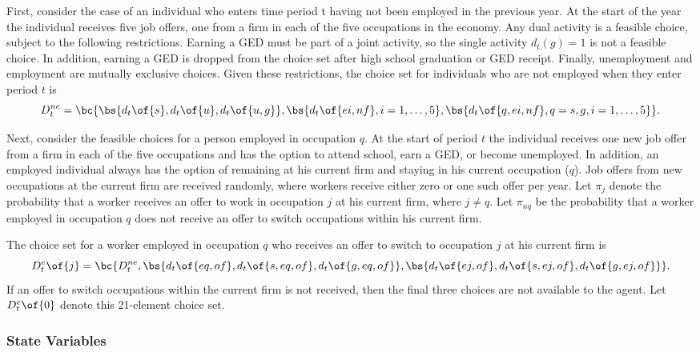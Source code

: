 \documentclass[12pt]{article}
\theoremstyle{definition}
\begin{document}
First, consider the case of an individual who enters time period t having not been employed in the previous year. At the start of the year the individual receives five job offers, one from a firm in each of the five occupations in the economy. Any dual activity is a feasible choice, subject to the following restrictions. Earning a GED must be part of a joint activity, so the single activity $d_t(g) = 1$ is not a feasible choice. In addition, earning a GED is dropped from the choice set after high school graduation or GED receipt. Finally, unemployment and employment are mutually exclusive choices. Given these restrictions, the choice set for individuals who are not employed when they enter period $t$ is
\begin{equation}
    \label{5}
    D_t^{ne} = \bc{\bs{d_t\of{s}, d_t\of{u}, d_t\of{u, g}}, \bs{d_t\of{ei, nf}, i=1,\ldots,5}, \bs{d_t\of{q, ei, nf}, q=s,g, i=1,\ldots,5}}.
\end{equation}

Next, consider the feasible choices for a person employed in occupation $q$. At the start of period $t$ the individual receives one new job offer from a firm in each of the five occupations and has the option to attend school, earn a GED, or become unemployed. In addition, an employed individual always has the option of remaining at his current firm and staying in his current occupation ($q$). Job offers from new occupations at the current firm are received randomly, where workers receive either zero or one such offer per year. Let $\pi_j$ denote the probability that a worker receives an offer to work in occupation $j$ at his current firm, where $j \neq q$. Let $\pi_{nq}$ be the probability that a worker employed in occupation $q$ does not receive an offer to switch occupations within his current firm. 

The choice set for a worker employed in occupation $q$ who receives an offer to switch to occupation $j$ at his current firm is 
\begin{equation}
    \label{6}
    D_t^{e}\of{j} = \bc{D_t^{ne}, \bs{d_t\of{eq, of}, d_t\of{s, eq, of}, d_t\of{g, eq, of}}, \bs{d_t\of{ej, of}, d_t\of{s, ej, of}, d_t\of{g, ej, of}}}.
\end{equation}
If an offer to switch occupations within the current firm is not received, then the final three choices are not available to the agent. Let $D_t^e\of{0}$ denote this 21-element choice set.

\subsubsection{State Variables}
\end{document}
